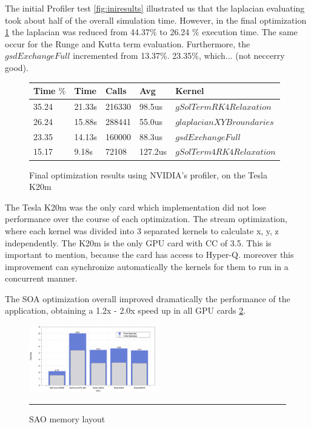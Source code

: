 The initial Profiler test \ref{fig:iniresults} illustrated us that the laplacian evaluating took about half of the overall simulation time. However, in the final optimization \ref{fig:final} the laplacian was reduced from 44.37$\%$ to 26.24 $\%$ execution time. The same occur for the Runge and Kutta term evaluation. Furthermore, the $gsdExchangeFull$ incremented from 13.37$\%$. 23.35$\%$, which... (not neccerry good).

\begin{figure}[htbp]
	\centering
	  \begin{tabular} { |  l  |  l | l  | l | l |}
	      \hline
	    Time $\%$& Time & Calls & Avg & Kernel \\
    \hline
   35.24 & 21.33s & 216330 & 98.5us & $gSolTermRK4Relaxation$ \\
   \hline
   26.24 & 15.88s & 288441 & 55.0us & $glaplacianXYBroundaries$\\
   \hline
   23.35 & 14.13s & 160000 & 88.3us & $gsdExchangeFull$ \\
   \hline
   15.17 & 9.18s & 72108 & 127.2us & $gSolTerm4RK4Relaxation$\\ 
   \hline
    \end{tabular}
	\caption[Optimization results with the Profiler]{Final optimization results using NVIDIA's profiler, on the Tesla K20m}
	\label{fig:final}
\end{figure}
    
The Tesla K20m was the only card which implementation did not lose performance over the course of each optimization. The stream optimization, where each kernel was divided into 3 separated kernels to calculate x, y, z independently. The K20m is the only GPU card with CC of 3.5. This is important to mention, because the card has access to Hyper-Q. moreover this improvement can synchronize automatically the kernels for them to run in a concurrent manner. 

The SOA optimization overall improved dramatically the performance of the application, obtaining a 1.2x - 2.0x speed up in all GPU cards \ref{fig:speedup}.

\begin{figure}[htbp]
	\centering
		\includegraphics[width=0.5\textwidth]{Figures/speed.png}
		\rule{35em}{0.2pt}
	\caption[Structure of Arrays (SAO)]{SAO memory layout}
	\label{fig:speedup}
\end{figure}


